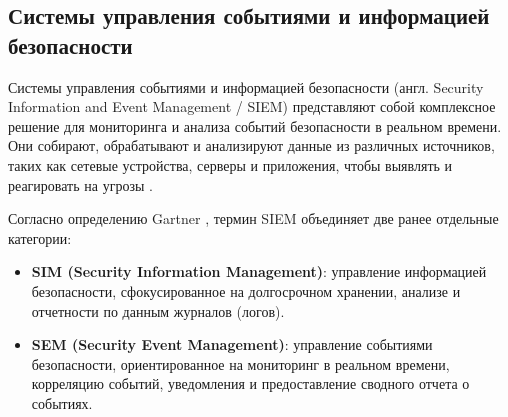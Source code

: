 \subsection{Системы управления событиями и информацией безопасности}

Системы управления событиями и информацией безопасности (англ. Security Information and Event Management / SIEM) представляют собой комплексное решение для мониторинга и анализа событий безопасности в реальном времени. Они собирают, обрабатывают и анализируют данные из различных источников, таких как сетевые устройства, серверы и приложения, чтобы выявлять и реагировать на угрозы \cite{SIEMSec}.

Согласно определению Gartner \cite{SIEMSec}, термин SIEM объединяет две ранее отдельные категории:
\begin{itemize}
    \item \textbf{SIM (Security Information Management)}: управление информацией безопасности, сфокусированное на долгосрочном хранении, анализе и отчетности по данным журналов (логов).
    \item \textbf{SEM (Security Event Management)}: управление событиями безопасности, ориентированное на мониторинг в реальном времени, корреляцию событий, уведомления и предоставление сводного отчета о событиях.
\end{itemize}

